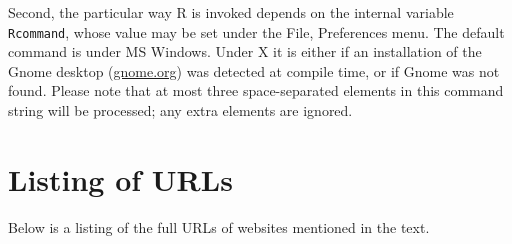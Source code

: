 Second, the particular way R is invoked depends on the internal
 variable \verb+Rcommand+, whose value may be set under the
File, Preferences menu.  The default command is  under
MS Windows. Under X it is either  if an
installation of the Gnome desktop
(\href{http://www.gnome.org/}{gnome.org}) was detected at compile
time, or  if Gnome was not found. Please note that at
most three space-separated elements in this command string will be
processed; any extra elements are ignored.

\chapter{Listing of URLs}
\label{app-urls}

Below is a listing of the full URLs of websites mentioned in the text.

